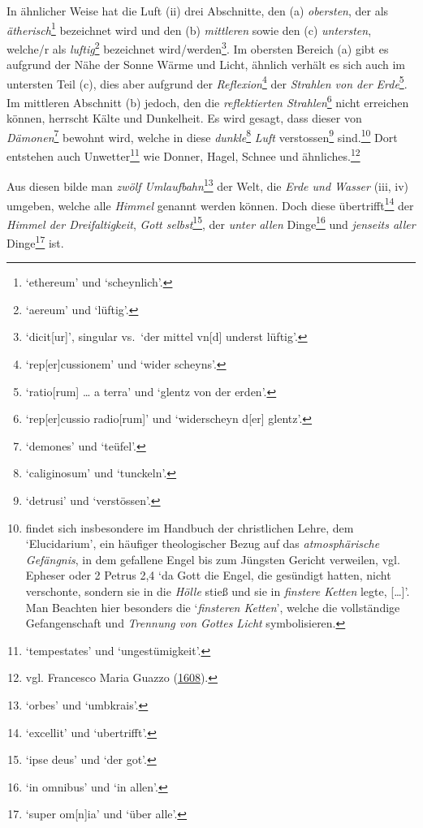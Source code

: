 \documentclass[
]{article}
\begin{document}
In ähnlicher Weise hat die Luft (ii) drei Abschnitte, den (a)
\emph{obersten}, der als \emph{ätherisch}\footnote{`ethereum' und
  `scheynlich'.} bezeichnet wird und den (b) \emph{mittleren} sowie den
(c) \emph{untersten}, welche/r als \emph{luftig}\footnote{`aereum' und
  `lüftig'.} bezeichnet wird/werden\footnote{`dicit{[}ur{]}', singular
  vs.~`der mittel vn{[}d{]} underst lüftig'.}. Im obersten Bereich (a)
gibt es aufgrund der Nähe der Sonne Wärme und Licht, ähnlich verhält es
sich auch im untersten Teil (c), dies aber aufgrund der
\emph{Reflexion}\footnote{`rep{[}er{]}cussionem' und `wider scheyns'.}
der \emph{Strahlen von der Erde}\footnote{`ratio{[}rum{]} \ldots{} a
  terra' und `glentz von der erden'.}. Im mittleren Abschnitt (b)
jedoch, den die \emph{reflektierten Strahlen}\footnote{`rep{[}er{]}cussio
  radio{[}rum{]}' und `widerscheyn d{[}er{]} glentz'.} nicht erreichen
können, herrscht Kälte und Dunkelheit. Es wird gesagt, dass dieser von
\emph{Dämonen}\footnote{`demones' und `teüfel'.} bewohnt wird, welche in
diese \emph{dunkle}\footnote{`caliginosum' und `tunckeln'.} \emph{Luft}
verstossen\footnote{`detrusi' und `verstössen'.} sind.\footnote{findet
  sich insbesondere im Handbuch der christlichen Lehre, dem
  `Elucidarium', ein häufiger theologischer Bezug auf das
  \emph{atmosphärische Gefängnis}, in dem gefallene Engel bis zum
  Jüngsten Gericht verweilen, vgl. Epheser oder 2 Petrus 2,4 `da Gott
  die Engel, die gesündigt hatten, nicht verschonte, sondern sie in die
  \emph{Hölle} stieß und sie in \emph{finstere Ketten} legte,
  {[}\ldots{]}'. Man Beachten hier besonders die `\emph{finsteren
  Ketten}', welche die vollständige Gefangenschaft und \emph{Trennung
  von} \emph{Gottes Licht} symbolisieren.} Dort entstehen auch
Unwetter\footnote{`tempestates' und `ungestümigkeit'.} wie Donner,
Hagel, Schnee und ähnliches.\footnote{vgl. Francesco Maria Guazzo
  (\href{https://archive.org/details/compendiummalefi00guaz/page/n2/mode/1up}{1608}).}

Aus diesen bilde man \emph{zwölf Umlaufbahn}\footnote{`orbes' und
  `umbkrais'.} der Welt, die \emph{Erde und Wasser} (iii, iv) umgeben,
welche alle \emph{Himmel} genannt werden können. Doch diese
übertrifft\footnote{`excellit' und `ubertrifft'.} der \emph{Himmel der
Dreifaltigkeit}, \emph{Gott selbst}\footnote{`ipse deus' und `der got'.},
der \emph{unter allen} Dinge\footnote{`in omnibus' und `in allen'.} und
\emph{jenseits aller} Dinge\footnote{`super om{[}n{]}ia' und `über
  alle'.} ist.
\end{document}
